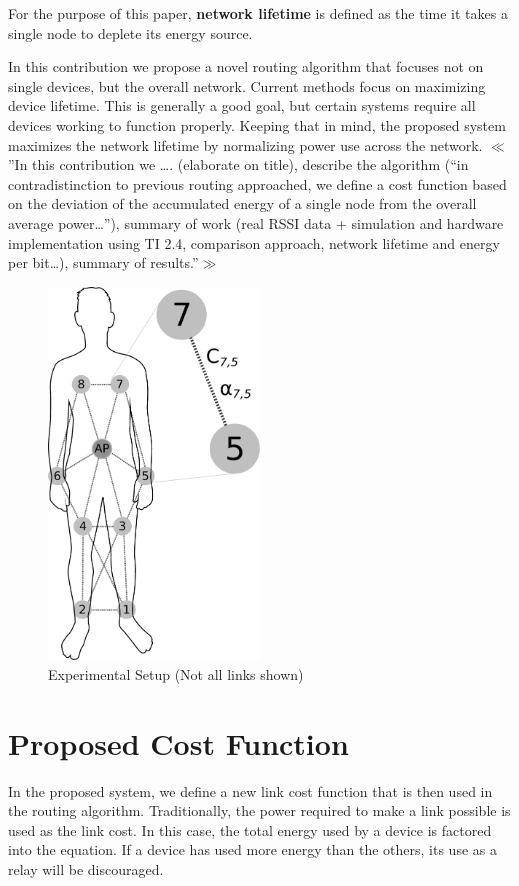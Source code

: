 \documentclass{article}
\begin{document}
For the purpose of this paper, \textbf{network lifetime} is defined as the time it takes a single node to deplete its energy source. 

In this contribution we propose a novel routing algorithm that focuses not on single devices, but the overall network. Current methods focus on maximizing device lifetime. This is generally a good goal, but certain systems require all devices working to function properly. Keeping that in mind, the proposed system maximizes the network lifetime by normalizing power use across the network.
$\ll$”In this contribution we …. (elaborate on title), describe the algorithm (“in contradistinction to previous routing approached, we define a cost function based on the deviation of the accumulated energy of a single node from the overall average power…”), summary of work (real RSSI data + simulation and hardware implementation using TI 2.4, comparison approach, network lifetime and energy per bit…), summary of results.”$\gg$ 

\begin{figure}[htb]
\begin{center}
\includegraphics[width=0.5\textwidth]{figures/body.pdf}
\end{center}
\caption{Experimental Setup (Not all links shown)}
\label{fig:body}
\end{figure}

\section{Proposed Cost Function}
In the proposed system, we define a new link cost function that is then used in the routing algorithm. Traditionally, the power required to make a link possible is used as the link cost. In this case, the total energy used by a device is factored into the equation. If a device has used more energy than the others, its use as a relay will be discouraged.
\end{document}
